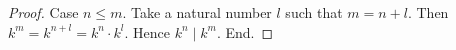 \documentclass[../../natural-numbers.ftl.tex]{subfiles}
\begin{document}
\begin{forthel}
\begin{proof}
      Case $n \leq m$.
        Take a natural number $l$ such that $m = n + l$.
        Then $k^{m} = k^{n + l} = k^{n} \cdot k^{l}$.
        Hence $k^{n} \mid k^{m}$.
      End.
    \end{proof}
  \end{forthel}
\end{document}
